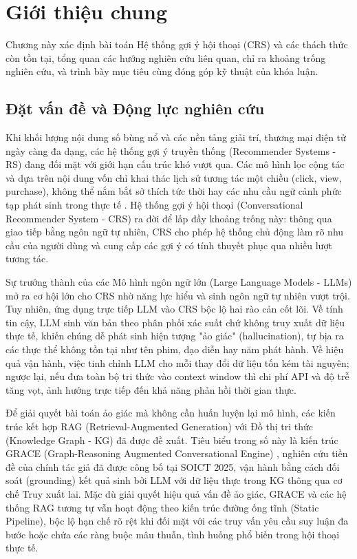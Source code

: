 \chapter{Giới thiệu chung}\label{chap:introduction}

Chương này xác định bài toán Hệ thống gợi ý hội thoại (CRS) và các thách thức còn tồn tại, tổng quan các hướng nghiên cứu liên quan, chỉ ra khoảng trống nghiên cứu, và trình bày mục tiêu cùng đóng góp kỹ thuật của khóa luận.


\section{Đặt vấn đề và Động lực nghiên cứu}

Khi khối lượng nội dung số bùng nổ và các nền tảng giải trí, thương mại điện tử ngày càng đa dạng, các hệ thống gợi ý truyền thống (Recommender Systems - RS) đang đối mặt với giới hạn cấu trúc khó vượt qua. Các mô hình lọc cộng tác và dựa trên nội dung vốn chỉ khai thác lịch sử tương tác một chiều (click, view, purchase), không thể nắm bắt sở thích tức thời hay các nhu cầu ngữ cảnh phức tạp phát sinh trong thực tế \cite{li2018towards, christakopoulou2016towardscrs}. Hệ thống gợi ý hội thoại (Conversational Recommender System - CRS) ra đời để lấp đầy khoảng trống này: thông qua giao tiếp bằng ngôn ngữ tự nhiên, CRS cho phép hệ thống chủ động làm rõ nhu cầu của người dùng và cung cấp các gợi ý có tính thuyết phục qua nhiều lượt tương tác.

Sự trưởng thành của các Mô hình ngôn ngữ lớn (Large Language Models - LLMs) mở ra cơ hội lớn cho CRS nhờ năng lực hiểu và sinh ngôn ngữ tự nhiên vượt trội. Tuy nhiên, ứng dụng trực tiếp LLM vào CRS bộc lộ hai rào cản cốt lõi. Về tính tin cậy, LLM sinh văn bản theo phân phối xác suất chứ không truy xuất dữ liệu thực tế, khiến chúng dễ phát sinh hiện tượng "ảo giác" (hallucination), tự bịa ra các thực thể không tồn tại như tên phim, đạo diễn hay năm phát hành. Về hiệu quả vận hành, việc tinh chỉnh LLM cho mỗi thay đổi dữ liệu tốn kém tài nguyên; ngược lại, nếu đưa toàn bộ tri thức vào context window thì chi phí API và độ trễ tăng vọt, ảnh hưởng trực tiếp đến khả năng phản hồi thời gian thực.

Để giải quyết bài toán ảo giác mà không cần huấn luyện lại mô hình, các kiến trúc kết hợp RAG (Retrieval-Augmented Generation) với Đồ thị tri thức (Knowledge Graph - KG) đã được đề xuất. Tiêu biểu trong số này là kiến trúc GRACE (Graph-Reasoning Augmented Conversational Engine) \cite{phan2025grace}, nghiên cứu tiền đề của chính tác giả đã được công bố tại SOICT 2025, vận hành bằng cách đối soát (grounding) kết quả sinh bởi LLM với dữ liệu thực trong KG thông qua cơ chế Truy xuất lai. Mặc dù giải quyết hiệu quả vấn đề ảo giác, GRACE và các hệ thống RAG tương tự vẫn hoạt động theo kiến trúc đường ống tĩnh (Static Pipeline), bộc lộ hạn chế rõ rệt khi đối mặt với các truy vấn yêu cầu suy luận đa bước hoặc chứa các ràng buộc mâu thuẫn, tình huống phổ biến trong hội thoại thực tế.

